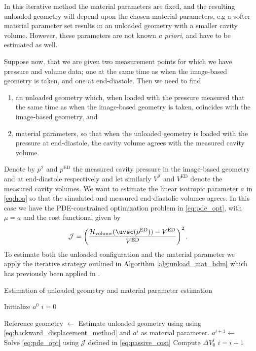 In this iterative method the material parameters are
fixed, and the resulting unloaded geometry will depend upon the chosen
material parameters, e.g a softer material parameter set results in an unloaded
geometry with a smaller cavity volume.
However, these parameters are not known \emph{a priori}, and have to
be estimated as well.

Suppose now, that we are given two measurement points for which we have
pressure and volume data; one at the same time as when the
image-based geometry is taken, and one at end-diastole. Then we need to find
\begin{enumerate}
  \item an unloaded geometry which, when loaded with the pressure
    measured that the same time as when the image-based geometry is
    taken, coincides with the image-based geometry, and
  \item material parameters, so that when the unloaded geometry is
    loaded with the pressure at end-diastole, the cavity volume
    agrees with the measured cavity volume.
  \end{enumerate}

Denote by $p^{\mathcal{I}}$ and $p^{\mathrm{ED}}$ the measured cavity
pressure in the image-based geometry and at end-diastole respectively
and let similarly $V^{\mathcal{I}}$ and $V^{\mathrm{ED}}$ denote the
measured cavity volumes. We want to estimate the linear isotropic
parameter $a$ in \eqref{eq:hoa} so that the simulated and measured
end-diastolic volumes agrees. In this
case we have the PDE-constrained optimization problem in
\eqref{eq:pde_opt}, with $\mu = a$ and the cost functional given by
\begin{align}
  \mathcal{J} = \left(\frac{\mathcal{H}_{\mathrm{volume}}(\uvec(p^{\mathrm{ED}}))
  - V^{\mathrm{ED}}}{V^{\mathrm{ED}}} \right)^2.
  \label{eq:passive_cost}
\end{align}
To estimate both the unloaded configuration and the material
parameter we apply the iterative strategy outlined in Algorithm
\ref{alg:unload_mat_bdm} which has previously been applied in
\cite{nikou2016effects,finsberg2017estimating}.
  
\begin{algorithm}
  \caption{Estimation of unloaded geometry and material parameter
    estimation\label{alg:unload_mat_bdm}}   
\begin{algorithmic}[1]

  \State Initialize $a^0$ 
  \State $i = 0$

  \State Reference geometry $\gets$ Estimate unloaded geometry using using
  \eqref{eq:backward_displacement_method} and $a^i$ as material parameter.
  \State $a^{i+1} \gets$ Solve \eqref{eq:pde_opt} using $\mathcal{J}$
  defined in \eqref{eq:passive_cost} 
  \State Compute $\Delta V_0^i$
  \State $i = i + 1$
  \EndWhile

\end{algorithmic}
\end{algorithm}

